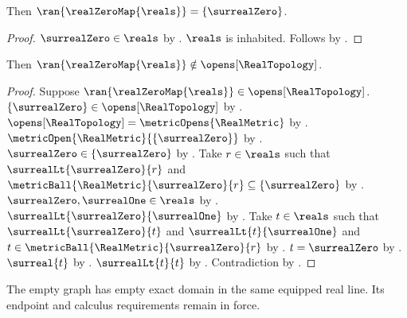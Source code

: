 \begin{theorem}\label{real_zero_map_image}
    Then $\ran{\realZeroMap{\reals}}=\{\surrealZero\}$.
\end{theorem}
\begin{proof}
    $\surrealZero\in\reals$ by .
    $\reals$ is inhabited.
    Follows by .
\end{proof}

\begin{theorem}\label{real_zero_map_image_not_open}
    Then $\ran{\realZeroMap{\reals}}\notin\opens[\RealTopology]$.
\end{theorem}
\begin{proof}
    Suppose $\ran{\realZeroMap{\reals}}\in\opens[\RealTopology]$.
    $\{\surrealZero\}\in\opens[\RealTopology]$ by .
    $\opens[\RealTopology]=\metricOpens{\RealMetric}$ by
        .
    $\metricOpen{\RealMetric}{\{\surrealZero\}}$ by .
    $\surrealZero\in\{\surrealZero\}$ by .
    Take $r\in\reals$ such that $\surrealLt{\surrealZero}{r}$ and
        $\metricBall{\RealMetric}{\surrealZero}{r}\subseteq\{\surrealZero\}$ by .
    $\surrealZero,\surrealOne\in\reals$ by .
    $\surrealLt{\surrealZero}{\surrealOne}$ by .
    Take $t\in\reals$ such that $\surrealLt{\surrealZero}{t}$ and
        $\surrealLt{t}{\surrealOne}$ and $t\in\metricBall{\RealMetric}{\surrealZero}{r}$ by
        .
    $t=\surrealZero$ by .
    $\surreal{t}$ by .
    $\surrealLt{t}{t}$ by \auto.
    Contradiction by .
\end{proof}

The empty graph has empty exact domain in the same equipped real line.
Its endpoint and calculus requirements remain in force.

